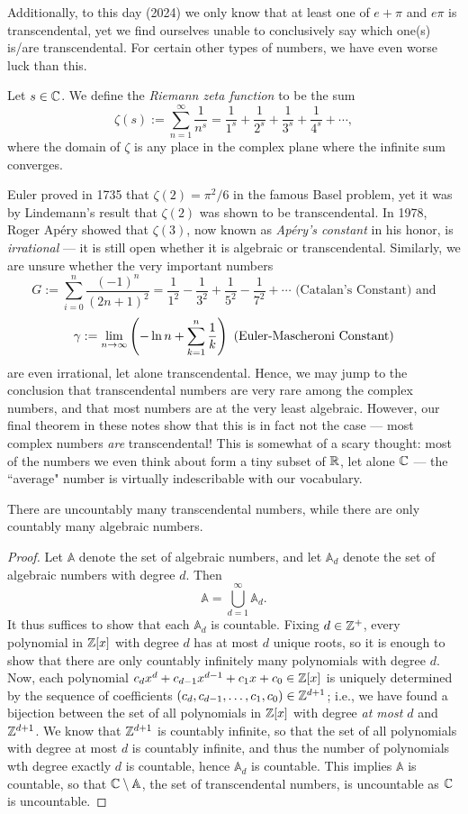 \documentclass{article}
\begin{document}
Additionally, to this day (2024) we only know that at least one of $e+\pi$ and $e\pi$ is transcendental, yet we find ourselves unable to conclusively say which one(s) is/are transcendental. For certain other types of numbers, we have even worse luck than this.
\begin{definition}
Let $s\in\mathbb C$. We define the \textit{Riemann zeta function} to be the sum
$$\zeta(s) := \sum_{n=1}^\infty \frac 1{n^s} = \frac 1{1^s} + \frac 1{2^s} + \frac 1{3^s} + \frac 1{4^s} + \cdots,$$
where the domain of $\zeta$ is any place in the complex plane where the infinite sum converges.
\end{definition}
Euler proved in 1735 that $\zeta(2) = \pi^2/6$ in the famous Basel problem, yet it was by Lindemann's result that $\zeta(2)$ was shown to be transcendental. In 1978, Roger Apéry showed that $\zeta(3)$, now known as \textit{Apéry's constant} in his honor, is \textit{irrational} --- it is still open whether it is algebraic or transcendental. Similarly, we are unsure whether the very important numbers
$$G := \sum_{i=0}^n \frac{(-1)^n}{(2n+1)^2} =  \frac 1{1^2} - \frac 1{3^2} + \frac 1{5^2} - \frac 1{7^2}+ \cdots \text{ (Catalan's Constant) and}$$
$$\gamma := \lim_{n\to\infty}\left(-\ln n + \sum_{k=1}^n \frac 1k \right) \text{ (Euler-Mascheroni Constant)}$$
are even irrational, let alone transcendental. Hence, we may jump to the conclusion that transcendental numbers are very rare among the complex numbers, and that most numbers are at the very least algebraic. However, our final theorem in these notes show that this is in fact not the case --- most complex numbers \textit{are} transcendental! This is somewhat of a scary thought: most of the numbers we even think about form a tiny subset of $\mathbb R$, let alone $\mathbb C$ --- the ``average" number is virtually indescribable with our vocabulary.

\begin{theorem}
There are uncountably many transcendental numbers, while there are only countably many algebraic numbers.
\end{theorem}
\begin{proof}
Let $\mathbb A$ denote the set of algebraic numbers, and let $\mathbb A_d$ denote the set of algebraic numbers with degree $d$. Then
$$\mathbb A = \bigcup_{d=1}^\infty \mathbb A_d.$$
It thus suffices to show that each $\mathbb A_d$ is countable. Fixing $d\in \mathbb Z^+$, every polynomial in $\mathbb Z[x]$ with degree $d$ has at most $d$ unique roots, so it is enough to show that there are only countably infinitely many polynomials with degree $d$. Now, each polynomial $c_dx^d+c_{d-1}x^{d-1} + c_1x + c_0\in\mathbb Z[x]$ is uniquely determined by the sequence of coefficients $(c_d, c_{d-1}, \ldots, c_1, c_0)\in \mathbb Z^{d+1}$; i.e., we have found a bijection between the set of all polynomials in $\mathbb Z[x]$ with degree \textit{at most $d$} and $\mathbb Z^{d+1}$. We know that $\mathbb Z^{d+1}$ is countably infinite, so that the set of all polynomials with degree at most $d$ is countably infinite, and thus the number of polynomials wth degree exactly $d$ is countable, hence $\mathbb A_d$ is countable. This implies $\mathbb A$ is countable, so that $\mathbb C\setminus\mathbb A$, the set of transcendental numbers, is uncountable as $\mathbb C$ is uncountable.
\end{proof}
\end{document}
